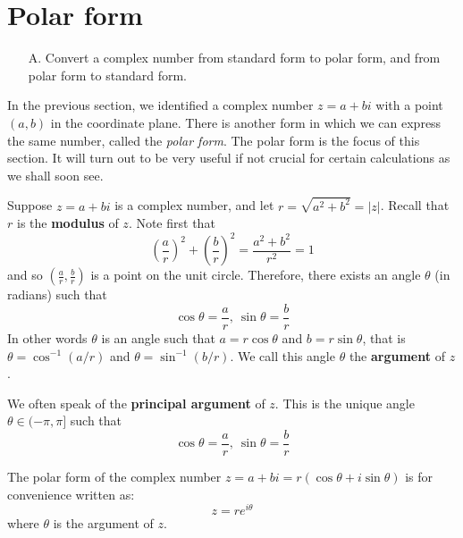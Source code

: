 \section{Polar form}

\begin{outcome}
\begin{enumerate}
\item[A.] Convert a complex number from standard form to polar form, and from polar form to standard form. 
\end{enumerate}
\end{outcome}

In the previous section, we identified a complex number $z=a+bi$ with
a point $\left( a, b\right)$ in the coordinate plane. There is 
another form in which we can express the same number, called the {\em
polar form\em}. The polar form is the focus of this section. It will turn out to be
very useful if not crucial for certain calculations as we shall soon
see.

Suppose $z=a+bi$ is a complex number,  and let 
$r=\sqrt{a^{2}+b^{2}} = |z|$. Recall that $r$ is the \textbf{modulus} of $z$. Note first that
\begin{equation*}
\left( \frac{a}{r} \right) ^{2}+\left( \frac{b}{r}\right) ^{2}=   \frac{a^2+b^2}{r^2}=1
\end{equation*}
and so $\left( \frac{a}{r},\frac{b}{r}\right)$
is a point on the unit circle. Therefore, there exists an angle  $
\theta$ (in radians) such that
\begin{equation*}
\cos \theta =\frac{a}{r},\ \sin \theta =\frac{b}{r}
\end{equation*}
In other words $\theta$ is an angle such
that $ a = r\cos \theta$ and $b=r \sin \theta$, that is $\theta = \cos^{-1}(a/r)$ and $\theta = \sin^{-1}(b/r)$. We call
this angle $\theta$ the \textbf{argument} of $z$. 

We often speak of the \textbf{principal argument} of $z$. This is the unique angle $\theta \in (-\pi, \pi]$ such that 
\begin{equation*}
\cos \theta =\frac{a}{r},\ \sin \theta =\frac{b}{r}
\end{equation*}

The polar form of the complex number $z=a+bi = r \left( \cos \theta +i\sin \theta \right)$ is for convenience written as:
\begin{equation*}
z = r e^{i \theta}
\end{equation*}
where $\theta $ is the argument of
$z$. 

